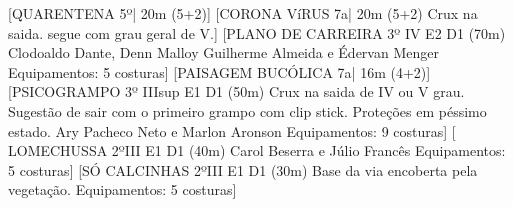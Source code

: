 \begin{CGSectorRoutes}
    [QUARENTENA 5º| 20m (5+2)]
    [CORONA VíRUS 7a| 20m (5+2) Crux na saida. segue com grau geral de V.]
    [PLANO DE CARREIRA 3º IV E2 D1 (70m) Clodoaldo Dante, Denn Malloy Guilherme Almeida e Édervan Menger Equipamentos: 5 costuras]
    [PAISAGEM BUCÓLICA 7a| 16m (4+2)]
    [PSICOGRAMPO 3º IIIsup E1 D1 (50m) Crux na saida de IV ou V grau. Sugestão de sair com o primeiro grampo com clip stick. Proteções em péssimo estado. Ary Pacheco Neto e Marlon Aronson Equipamentos: 9 costuras]
    [ LOMECHUSSA 2ºIII E1 D1 (40m) Carol Beserra e Júlio Francês
Equipamentos: 5 costuras]
    [SÓ CALCINHAS 2ºIII E1 D1 (30m) Base da via encoberta pela vegetação. Equipamentos: 5 costuras]
\end{CGSectorRoutes}

